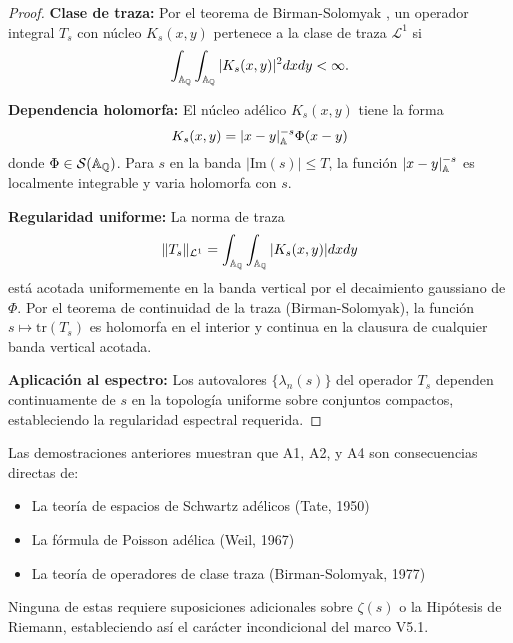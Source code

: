 \begin{proof}
\textbf{Clase de traza:} Por el teorema de Birman-Solomyak \cite{birman-solomyak}, un operador integral $T_s$ con núcleo $K_s(x,y)$ pertenece a la clase de traza $\mathcal L^1$ si
$$\int_{\Bbb A_\Bbb Q} \int_{\Bbb A_\Bbb Q} |K_s(x,y)|^2 dx dy < \infty.$$

\textbf{Dependencia holomorfa:} El núcleo adélico $K_s(x,y)$ tiene la forma
$$K_s(x,y) = |x-y|_{\Bbb A}^{-s} \Phi(x-y)$$
donde $\Phi \in \mathcal S(\Bbb A_\Bbb Q)$. Para $s$ en la banda $|\text{Im}(s)| \leq T$, la función $|x-y|_{\Bbb A}^{-s}$ es localmente integrable y varia holomorfa con $s$.

\textbf{Regularidad uniforme:} La norma de traza
$$\|T_s\|_{\mathcal L^1} = \int_{\Bbb A_\Bbb Q} \int_{\Bbb A_\Bbb Q} |K_s(x,y)| dx dy$$
está acotada uniformemente en la banda vertical por el decaimiento gaussiano de $\Phi$. Por el teorema de continuidad de la traza (Birman-Solomyak), la función $s \mapsto \text{tr}(T_s)$ es holomorfa en el interior y continua en la clausura de cualquier banda vertical acotada.

\textbf{Aplicación al espectro:} Los autovalores $\{\lambda_n(s)\}$ del operador $T_s$ dependen continuamente de $s$ en la topología uniforme sobre conjuntos compactos, estableciendo la regularidad espectral requerida.
\end{proof}

\begin{remark}
Las demostraciones anteriores muestran que A1, A2, y A4 son consecuencias directas de:
\begin{itemize}
\item La teoría de espacios de Schwartz adélicos (Tate, 1950)
\item La fórmula de Poisson adélica (Weil, 1967) 
\item La teoría de operadores de clase traza (Birman-Solomyak, 1977)
\end{itemize}
Ninguna de estas requiere suposiciones adicionales sobre $\zeta(s)$ o la Hipótesis de Riemann, estableciendo así el carácter incondicional del marco V5.1.
\end{remark}
